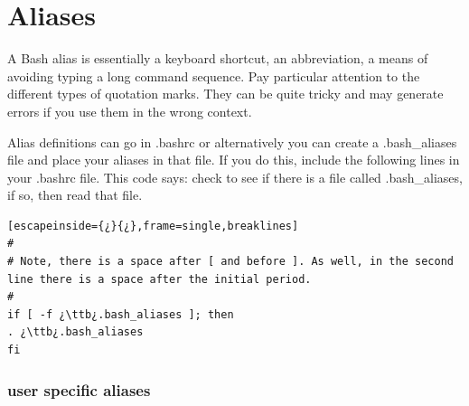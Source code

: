 \section{Aliases}\label{sec:aliases}

A Bash alias is essentially a keyboard shortcut, an abbreviation, a means of avoiding typing a long command sequence. Pay particular attention to the different types of quotation marks. They can be quite tricky and may generate errors if you use them in the wrong context.

Alias definitions can go in \ttb{}.bashrc or alternatively you can create a \ttb{}.bash\_aliases file and place your aliases in that file. If you do this, include the following lines in your \ttb{}.bashrc file. This code says: check to see if there is a file called \ttb{}.bash\_aliases, if so, then read that file.

\begin{lstlisting}[escapeinside={¿}{¿},frame=single,breaklines]
#
# Note, there is a space after [ and before ]. As well, in the second line there is a space after the initial period.
#
if [ -f ¿\ttb¿.bash_aliases ]; then
. ¿\ttb¿.bash_aliases
fi
\end{lstlisting}

\subsubsection{user specific aliases}

